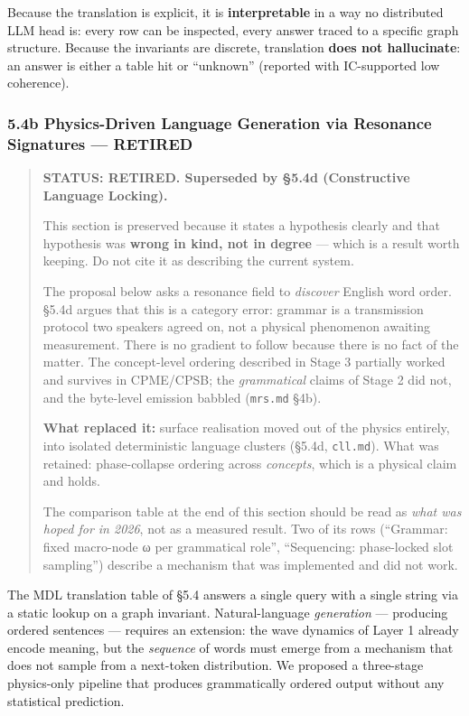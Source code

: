 \documentclass[
  11pt,
  a4paper,
]{article}
\begin{document}
Because the translation is explicit, it is \textbf{interpretable} in a
way no distributed LLM head is: every row can be inspected, every answer
traced to a specific graph structure. Because the invariants are
discrete, translation \textbf{does not hallucinate}: an answer is either
a table hit or ``unknown'' (reported with IC-supported low coherence).

\subsubsection{\texorpdfstring{5.4b Physics-Driven Language Generation
via Resonance Signatures ---
\textbf{RETIRED}}{5.4b Physics-Driven Language Generation via Resonance Signatures --- RETIRED}}\label{b-physics-driven-language-generation-via-resonance-signatures-retired}

\begin{quote}
\textbf{STATUS: RETIRED. Superseded by §5.4d (Constructive Language
Locking).}

This section is preserved because it states a hypothesis clearly and
that hypothesis was \textbf{wrong in kind, not in degree} --- which is a
result worth keeping. Do not cite it as describing the current system.

The proposal below asks a resonance field to \emph{discover} English
word order. §5.4d argues that this is a category error: grammar is a
transmission protocol two speakers agreed on, not a physical phenomenon
awaiting measurement. There is no gradient to follow because there is no
fact of the matter. The concept-level ordering described in Stage 3
partially worked and survives in CPME/CPSB; the \emph{grammatical}
claims of Stage 2 did not, and the byte-level emission babbled
(\texttt{mrs.md} §4b).

\textbf{What replaced it:} surface realisation moved out of the physics
entirely, into isolated deterministic language clusters (§5.4d,
\texttt{cll.md}). What was retained: phase-collapse ordering across
\emph{concepts}, which is a physical claim and holds.

The comparison table at the end of this section should be read as
\emph{what was hoped for in 2026}, not as a measured result. Two of its
rows (``Grammar: fixed macro-node ω per grammatical role'',
``Sequencing: phase-locked slot sampling'') describe a mechanism that
was implemented and did not work.
\end{quote}

The MDL translation table of §5.4 answers a single query with a single
string via a static lookup on a graph invariant. Natural-language
\emph{generation} --- producing ordered sentences --- requires an
extension: the wave dynamics of Layer 1 already encode meaning, but the
\emph{sequence} of words must emerge from a mechanism that does not
sample from a next-token distribution. We proposed a three-stage
physics-only pipeline that produces grammatically ordered output without
any statistical prediction.
\end{document}
